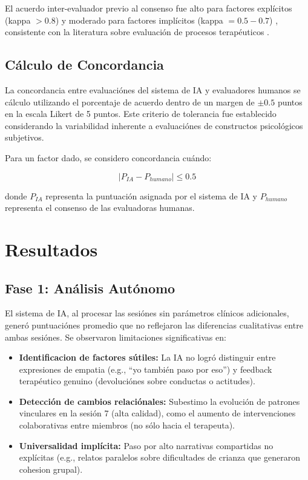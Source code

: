 \documentclass[12pt,a4paper,twoside]{book}
\begin{document}
El acuerdo inter-evaluador previo al consenso fue alto para factores explícitos (kappa $> 0.8$) y moderado para factores implícitos (kappa $= 0.5-0.7$) \cite{fleiss1971kappa, landis1977kappa}, consistente con la literatura sobre evaluación de procesos terapéuticos \cite{bormann2011group}.

\subsection{Cálculo de Concordancia}

La concordancia entre evaluaciónes del sistema de IA y evaluadores humanos se cálculo utilizando el porcentaje de acuerdo dentro de un margen de $\pm 0.5$ puntos en la escala Likert de 5 puntos. Este criterio de tolerancia fue establecido considerando la variabilidad inherente a evaluaciónes de constructos psicológicos subjetivos.

Para un factor dado, se considero concordancia cuándo:

\begin{equation}
|P_{IA} - P_{humano}| \leq 0.5
\end{equation}

donde $P_{IA}$ representa la puntuación asignada por el sistema de IA y $P_{humano}$ representa el consenso de las evaluadoras humanas.

\section{Resultados}

\subsection{Fase 1: Análisis Autónomo}

El sistema de IA, al procesar las sesiónes sin parámetros clínicos adicionales, generó puntuaciónes promedio que no reflejaron las diferencias cualitativas entre ambas sesiónes. Se observaron limitaciones significativas en:

\begin{itemize}
    \item \textbf{Identificacion de factores sútiles:} La IA no logró distinguir entre expresiones de empatia (e.g., ``yo también paso por eso'') y feedback terapéutico genuino (devoluciónes sobre conductas o actitudes).
    
    \item \textbf{Detección de cambios relaciónales:} Subestimo la evolución de patrones vinculares en la sesión 7 (alta calidad), como el aumento de intervenciones colaborativas entre miembros (no sólo hacia el terapeuta).
    
    \item \textbf{Universalidad implícita:} Paso por alto narrativas compartidas no explícitas (e.g., relatos paralelos sobre dificultades de crianza que generaron cohesion grupal).
\end{itemize}
\end{document}
